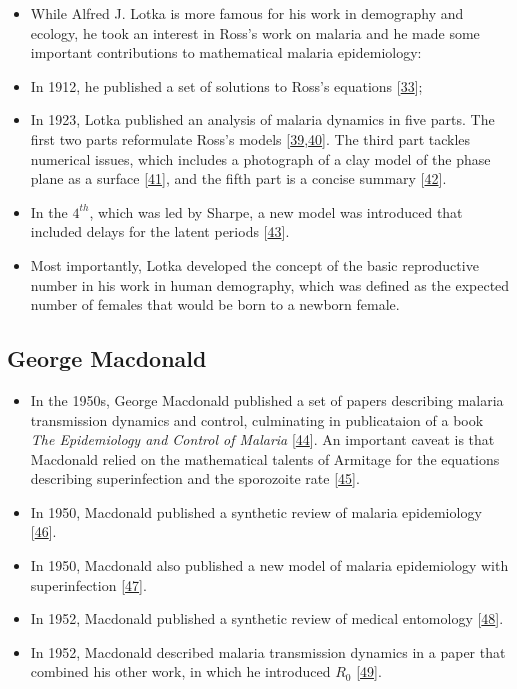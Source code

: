\documentclass[
]{book}
\begin{document}
\begin{itemize}
\item
  While Alfred J. Lotka is more famous for his work in demography and ecology, he took an interest in Ross's work on malaria and he made some important contributions to mathematical malaria epidemiology:
\item
  In 1912, he published a set of solutions to Ross's equations {[}\protect\hyperlink{ref-LotkaAJ1912Nature}{33}{]};
\item
  In 1923, Lotka published an analysis of malaria dynamics in five parts. The first two parts reformulate Ross's models {[}\protect\hyperlink{ref-LotkaAJ1923part1}{39},\protect\hyperlink{ref-LotkaAJ1923part2}{40}{]}. The third part tackles numerical issues, which includes a photograph of a clay model of the phase plane as a surface {[}\protect\hyperlink{ref-LotkaAJ1923part3}{41}{]}, and the fifth part is a concise summary {[}\protect\hyperlink{ref-LotkaAJ1923part5}{42}{]}.
\item
  In the \(4^{th}\), which was led by Sharpe, a new model was introduced that included delays for the latent periods {[}\protect\hyperlink{ref-LotkaAJ1923part4}{43}{]}.
\item
  Most importantly, Lotka developed the concept of the basic reproductive number in his work in human demography, which was defined as the expected number of females that would be born to a newborn female.
\end{itemize}

\hypertarget{george-macdonald}{%
\subsection{George Macdonald}\label{george-macdonald}}

\begin{itemize}
\item
  In the 1950s, George Macdonald published a set of papers describing malaria transmission dynamics and control, culminating in publicataion of a book \emph{The Epidemiology and Control of Malaria} {[}\protect\hyperlink{ref-MacdonaldG1957Book}{44}{]}. An important caveat is that Macdonald relied on the mathematical talents of Armitage for the equations describing superinfection and the sporozoite rate {[}\protect\hyperlink{ref-ArmitageP1953}{45}{]}.
\item
  In 1950, Macdonald published a synthetic review of malaria epidemiology {[}\protect\hyperlink{ref-MacdonaldG1950Epidemiology}{46}{]}.
\item
  In 1950, Macdonald also published a new model of malaria epidemiology with superinfection {[}\protect\hyperlink{ref-MacdonaldG1950Superinfection}{47}{]}.
\item
  In 1952, Macdonald published a synthetic review of medical entomology {[}\protect\hyperlink{ref-MacdonaldG1952Sporozoite}{48}{]}.
\item
  In 1952, Macdonald described malaria transmission dynamics in a paper that combined his other work, in which he introduced \(R_0\) {[}\protect\hyperlink{ref-MacdonaldG1952R0}{49}{]}.
\end{itemize}
\end{document}

